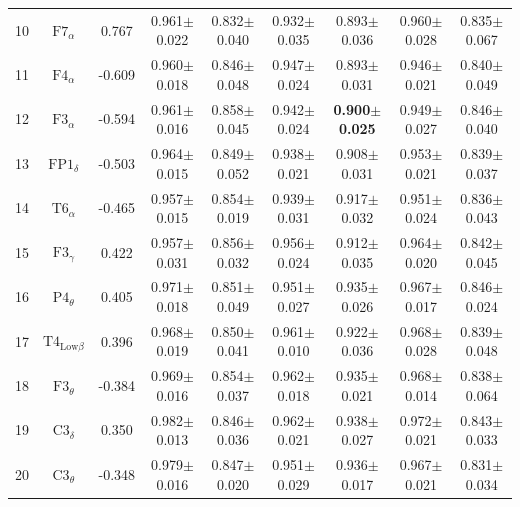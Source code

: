 \documentclass[pdflatex,sn-mathphys]{sn-jnl}%
\theoremstyle{thmstyleone}%
\theoremstyle{thmstyletwo}%
\theoremstyle{thmstylethree}%
\begin{document}
\begin{appendices}
\begin{table}[h!]
{\begin{tabular}{r|cccccccc}
  10 &          $\text{F7}_{\alpha}$ &  0.767 &          0.961$\pm$0.022 &          0.832$\pm$0.040 &          0.932$\pm$0.035 &          0.893$\pm$0.036 &          0.960$\pm$0.028 &          0.835$\pm$0.067 \\
  11 &          $\text{F4}_{\alpha}$ & -0.609 &          0.960$\pm$0.018 &          0.846$\pm$0.048 &          0.947$\pm$0.024 &          0.893$\pm$0.031 &          0.946$\pm$0.021 &          0.840$\pm$0.049 \\
  12 &          $\text{F3}_{\alpha}$ & -0.594 &          0.961$\pm$0.016 &          0.858$\pm$0.045 &          0.942$\pm$0.024 & \textbf{0.900$\pm$0.025} &          0.949$\pm$0.027 &          0.846$\pm$0.040 \\
  13 &         $\text{FP1}_{\delta}$ & -0.503 &          0.964$\pm$0.015 &          0.849$\pm$0.052 &          0.938$\pm$0.021 &          0.908$\pm$0.031 &          0.953$\pm$0.021 &          0.839$\pm$0.037 \\
  14 &          $\text{T6}_{\alpha}$ & -0.465 &          0.957$\pm$0.015 &          0.854$\pm$0.019 &          0.939$\pm$0.031 &          0.917$\pm$0.032 &          0.951$\pm$0.024 &          0.836$\pm$0.043 \\
  15 &          $\text{F3}_{\gamma}$ &  0.422 &          0.957$\pm$0.031 &          0.856$\pm$0.032 &          0.956$\pm$0.024 &          0.912$\pm$0.035 &          0.964$\pm$0.020 &          0.842$\pm$0.045 \\
  16 &          $\text{P4}_{\theta}$ &  0.405 &          0.971$\pm$0.018 &          0.851$\pm$0.049 &          0.951$\pm$0.027 &          0.935$\pm$0.026 &          0.967$\pm$0.017 &          0.846$\pm$0.024 \\
  17 & $\text{T4}_{\text{Low}\beta}$ &  0.396 &          0.968$\pm$0.019 &          0.850$\pm$0.041 &          0.961$\pm$0.010 &          0.922$\pm$0.036 &          0.968$\pm$0.028 &          0.839$\pm$0.048 \\
  18 &          $\text{F3}_{\theta}$ & -0.384 &          0.969$\pm$0.016 &          0.854$\pm$0.037 &          0.962$\pm$0.018 &          0.935$\pm$0.021 &          0.968$\pm$0.014 &          0.838$\pm$0.064 \\
  19 &          $\text{C3}_{\delta}$ &  0.350 &          0.982$\pm$0.013 &          0.846$\pm$0.036 &          0.962$\pm$0.021 &          0.938$\pm$0.027 &          0.972$\pm$0.021 &          0.843$\pm$0.033 \\
  20 &          $\text{C3}_{\theta}$ & -0.348 &          0.979$\pm$0.016 &          0.847$\pm$0.020 &          0.951$\pm$0.029 &          0.936$\pm$0.017 &          0.967$\pm$0.021 &          0.831$\pm$0.034 \\

\end{tabular}}
\end{table}
\end{appendices}
\end{document}
